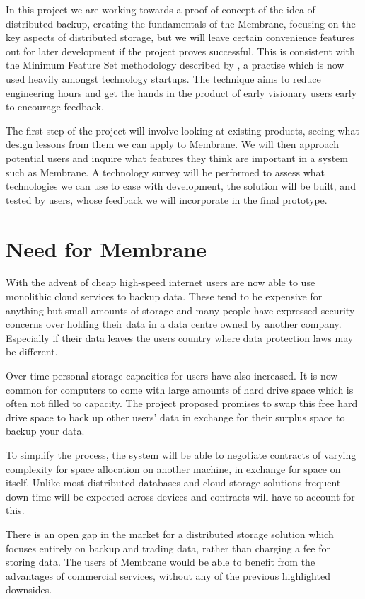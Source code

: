 \documentclass[a4paper, 11pt, twocolumn, twoside]{report}
\begin{document}
In this project we are working towards a proof of concept of the idea of distributed backup, creating the fundamentals of the Membrane, focusing on the key aspects of distributed storage, but we will leave certain convenience features out for later development if the project proves successful. This is consistent with the Minimum Feature Set methodology described by \cite{blank2010mfs}, a practise which is now used heavily amongst technology startups. The technique aims to reduce engineering hours and get the hands in the product of early visionary users early to encourage feedback.

The first step of the project will involve looking at existing products, seeing what design lessons from them we can apply to Membrane. We will then approach potential users and inquire what features they think are important in a system such as Membrane. A technology survey will be performed to assess what technologies we can use to ease with development, the solution will be built, and tested by users, whose feedback we will incorporate in the final prototype.

\section{Need for Membrane}

With the advent of cheap high-speed internet users are now able to use monolithic cloud services to backup data. These tend to be expensive for anything but small amounts of storage and many people have expressed security concerns over holding their data in a data centre owned by another company. \citep{batters2010dbsecurity} Especially if their data leaves the users country where data protection laws may be different.

Over time personal storage capacities for users have also increased. It is now common for computers to come with large amounts of hard drive space which is often not filled to capacity. The project proposed promises to swap this free hard drive space to back up other users’ data in exchange for their surplus space to backup your data.

To simplify the process, the system will be able to negotiate contracts of varying complexity for space allocation on another machine, in exchange for space on itself. Unlike most distributed databases and cloud storage solutions frequent down-time will be expected across devices and contracts will have to account for this.

There is an open gap in the market for a distributed storage solution which focuses entirely on backup and trading data, rather than charging a fee for storing data. The users of Membrane would be able to benefit from the advantages of commercial services, without any of the previous highlighted downsides.
\end{document}
